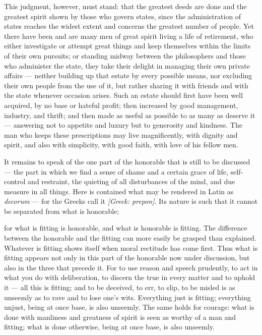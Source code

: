  This judgment, however, must stand: that the greatest deeds are done and the greatest spirit shown by those who govern states, since the administration of states reaches the widest extent and concerns the greatest number of people. Yet there have been and are many men of great spirit living a life of retirement, who either investigate or attempt great things and keep themselves within the limits of their own pursuits; or standing midway between the philosophers and those who administer the state, they take their delight in managing their own private affairs — neither building up that estate by every possible means, nor excluding their own people from the use of it, but rather sharing it with friends and with the state whenever occasion arises. Such an estate should first have been well acquired, by no base or hateful profit; then increased by good management, industry, and thrift; and then made as useful as possible to as many as deserve it — answering not to appetite and luxury but to generosity and kindness. The man who keeps these prescriptions may live magnificently, with dignity and spirit, and also with simplicity, with good faith, with love of his fellow men.

 It remains to speak of the one part of the honorable that is still to be discussed — the part in which we find a sense of shame and a certain grace of life, self-control and restraint, the quieting of all disturbances of the mind, and due measure in all things. Here is contained what may be rendered in Latin as \textit{decorum} — for the Greeks call it \textit{[Greek: prepon]}. Its nature is such that it cannot be separated from what is honorable;

 for what is fitting is honorable, and what is honorable is fitting. The difference between the honorable and the fitting can more easily be grasped than explained. Whatever is fitting shows itself when moral rectitude has come first. Thus what is fitting appears not only in this part of the honorable now under discussion, but also in the three that precede it. For to use reason and speech prudently, to act in what you do with deliberation, to discern the true in every matter and to uphold it — all this is fitting; and to be deceived, to err, to slip, to be misled is as unseemly as to rave and to lose one's wits. Everything just is fitting; everything unjust, being at once base, is also unseemly. The same holds for courage: what is done with manliness and greatness of spirit is seen as worthy of a man and fitting; what is done otherwise, being at once base, is also unseemly.

